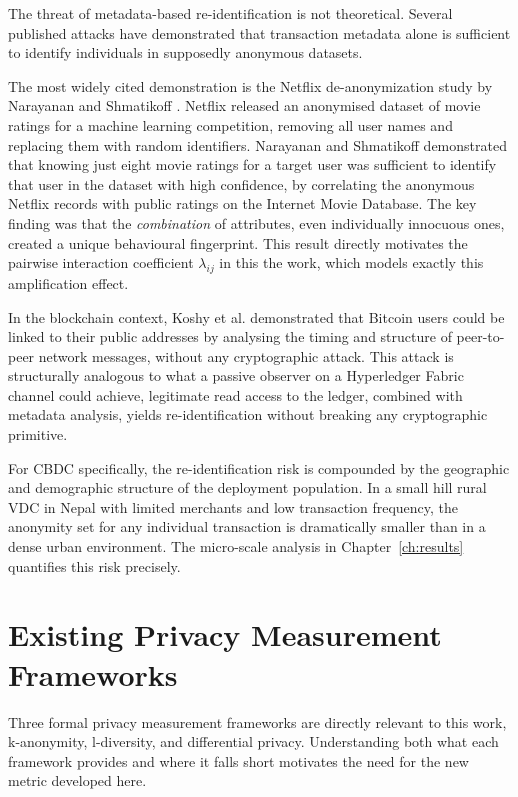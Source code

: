The threat of metadata-based re-identification is not
theoretical. Several published attacks have demonstrated
that transaction metadata alone is sufficient to identify
individuals in supposedly anonymous datasets.

The most widely cited demonstration is the Netflix
de-anonymization study by Narayanan and Shmatikoff
\cite{narayanan2008}. Netflix released an anonymised
dataset of movie ratings for a machine learning competition,
removing all user names and replacing them with random
identifiers. Narayanan and Shmatikoff demonstrated that
knowing just eight movie ratings for a target user was
sufficient to identify that user in the dataset with high
confidence, by correlating the anonymous Netflix records with
public ratings on the Internet Movie Database. The key
finding was that the \textit{combination} of attributes,
even individually innocuous ones, created a unique
behavioural fingerprint. This result directly motivates the
pairwise interaction coefficient $\lambda_{ij}$ in this
the work, which models exactly this amplification effect.

In the blockchain context, Koshy et al.
\cite{koshy2014} demonstrated that Bitcoin users could
be linked to their public addresses by analysing the timing
and structure of peer-to-peer network messages, without any
cryptographic attack. This attack is structurally analogous
to what a passive observer on a Hyperledger Fabric channel
could achieve, legitimate read access to the ledger, combined
with metadata analysis, yields re-identification without
breaking any cryptographic primitive.

For CBDC specifically, the re-identification risk is
compounded by the geographic and demographic structure of
the deployment population. In a small hill rural VDC in
Nepal with limited merchants and low transaction frequency,
the anonymity set for any individual transaction is
dramatically smaller than in a dense urban environment. The
micro-scale analysis in Chapter~\ref{ch:results} quantifies
this risk precisely.

\section{Existing Privacy Measurement Frameworks}
\label{sec:privacy_frameworks}

Three formal privacy measurement frameworks are directly
relevant to this work, k-anonymity, l-diversity, and
differential privacy. Understanding both what each framework
provides and where it falls short motivates the need for
the new metric developed here.

